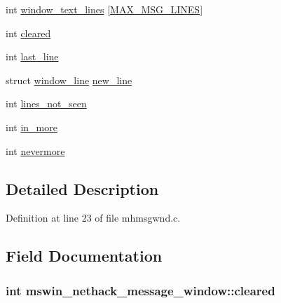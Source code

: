 \begin{DoxyCompactItemize}
\item 
int \hyperlink{structmswin__nethack__message__window_afa2db7ba637e5708d489acbddc9e989d}{window\+\_\+text\+\_\+lines} \mbox{[}\hyperlink{win_2win32_2mhmsgwnd_8c_af62d3eba40911b9d82f6e377b48a50e2}{M\+A\+X\+\_\+\+M\+S\+G\+\_\+\+L\+I\+N\+E\+S}\mbox{]}
\item 
int \hyperlink{structmswin__nethack__message__window_ac7120601d4735608d1b4374d24cd348f}{cleared}
\item 
int \hyperlink{structmswin__nethack__message__window_ae7ecc61ab8572e72f04323746402282f}{last\+\_\+line}
\item 
struct \hyperlink{structwindow__line}{window\+\_\+line} \hyperlink{structmswin__nethack__message__window_ac25c648cce60829c413d9ffa9da703bb}{new\+\_\+line}
\item 
int \hyperlink{structmswin__nethack__message__window_a03376eec1493f3cbe10aa7608b06da71}{lines\+\_\+not\+\_\+seen}
\item 
int \hyperlink{structmswin__nethack__message__window_a9b3ed726a4e021a2b7532e4f4af2dfe5}{in\+\_\+more}
\item 
int \hyperlink{structmswin__nethack__message__window_a4da794907bafacc07e6227112897d153}{nevermore}
\end{DoxyCompactItemize}


\subsection{Detailed Description}


Definition at line 23 of file mhmsgwnd.\+c.



\subsection{Field Documentation}
\hypertarget{structmswin__nethack__message__window_ac7120601d4735608d1b4374d24cd348f}{
\subsubsection[{cleared}]{\setlength{\rightskip}{0pt plus 5cm}int mswin\+\_\+nethack\+\_\+message\+\_\+window\+::cleared}}\label{structmswin__nethack__message__window_ac7120601d4735608d1b4374d24cd348f}


